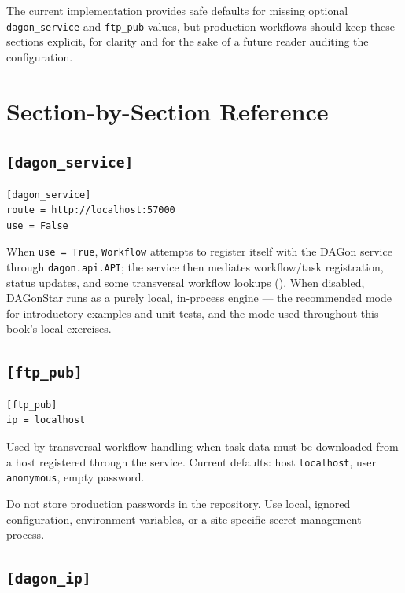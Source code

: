 The current implementation provides safe defaults for missing optional
\texttt{dagon\_service} and \texttt{ftp\_pub} values, but production
workflows should keep these sections explicit, for clarity and for the sake
of a future reader auditing the configuration.

\section{Section-by-Section Reference}

\subsection{\texttt{[dagon\_service]}}

\begin{lstlisting}[style=ini]
[dagon_service]
route = http://localhost:57000
use = False
\end{lstlisting}

When \texttt{use = True}, \texttt{Workflow} attempts to register itself with
the DAGon service through \texttt{dagon.api.API}; the service then mediates
workflow/task registration, status updates, and some transversal workflow
lookups (). When disabled, DAGonStar runs as a
purely local, in-process engine --- the recommended mode for introductory
examples and unit tests, and the mode used throughout this book's local
exercises.

\subsection{\texttt{[ftp\_pub]}}

\begin{lstlisting}[style=ini]
[ftp_pub]
ip = localhost
\end{lstlisting}

Used by transversal workflow handling when task data must be downloaded from
a host registered through the service. Current defaults: host
\texttt{localhost}, user \texttt{anonymous}, empty password.
\begin{cautionbox}
Do not store production passwords in the repository. Use local, ignored
configuration, environment variables, or a site-specific secret-management
process.
\end{cautionbox}

\subsection{\texttt{[dagon\_ip]}}

